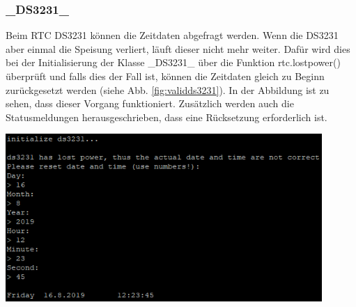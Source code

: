 \subsubsection{\_DS3231\_}
\label{subsubsec:valDS3231}
\begin{minipage}[b][6.5cm][t]{0.48\textwidth}
Beim RTC DS3231 können die Zeitdaten abgefragt werden. Wenn die DS3231 aber einmal die Speisung verliert, läuft dieser nicht mehr weiter. Dafür wird dies bei der Initialisierung der Klasse \_DS3231\_ über die Funktion rtc.lostpower() überprüft und falls dies der Fall ist, können die Zeitdaten gleich zu Beginn zurückgesetzt werden (siehe Abb. \ref{fig:validds3231}). In der Abbildung ist zu sehen, dass dieser Vorgang funktioniert. Zusätzlich werden auch die Statusmeldungen herausgeschrieben, dass eine Rücksetzung erforderlich ist.\\
\end{minipage}
\begin{minipage}[b][6.5cm][t]{0.4\textwidth}
\centering
\includegraphics[width=0.9\textwidth]{../../graphics/FW_val/ds3231.PNG} 
\label{fig:validds3231}
\end{minipage}

